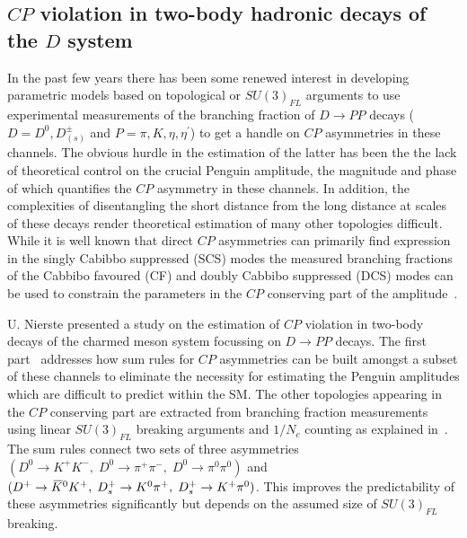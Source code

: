 \documentclass{PoS}
\def\Kbar{{\kern 0.2em\overline{\kern -0.2em \ensuremath{K}}{}}\xspace}
\newcommand\Kzb{{\ensuremath{\Kbar{}^0}}\xspace}
\newcommand{\CP}{{\ensuremath{C\!P}}\xspace}
\begin{document}
\subsection{\CP violation in two-body hadronic decays of the \boldmath $D$ system}
\label{sec:pheno:twobody}
In the past few years there has been some renewed interest in developing parametric models based on topological or $SU(3)_{FL}$ arguments to use experimental measurements of the branching fraction of $D\to P P $ decays ($D = D^0, D^\pm_{(s)}$ and $P=\pi,K,\eta,\eta^\prime$) to get a handle on \CP asymmetries in these channels. The obvious hurdle in the estimation of the latter has been the the lack of theoretical control on the crucial Penguin amplitude, the magnitude and phase of which quantifies the \CP asymmetry in these channels. In addition, the complexities of disentangling the short distance from the long distance at scales of these decays render theoretical estimation of many other topologies difficult. While it is well known that direct \CP asymmetries can primarily find expression in the singly Cabibbo suppressed (SCS) modes the measured branching fractions of the Cabbibo favoured (CF) and doubly Cabbibo suppressed (DCS) modes can be used to constrain the parameters in the \CP conserving part of the amplitude~\cite{Hiller:2012xm,Muller:2015rna,Nierste:2015zra}. 

U. Nierste presented a study on the estimation of \CP violation in two-body decays of the charmed meson system focussing on $D\to P P$ decays. The first part~\cite{Muller:2015rna} addresses how sum rules for \CP asymmetries can be built amongst a subset of these channels to eliminate the necessity for estimating the Penguin amplitudes which are difficult to predict within the SM. The other topologies appearing in the \CP conserving part are extracted from branching fraction measurements using linear $SU(3)_{FL}$ breaking arguments and $1/N_c$ counting as explained in~\cite{Muller:2015lua}. The sum rules connect two sets of three asymmetries $(D^0\to K^+K^-,\; D^0\to \pi^+\pi^-,\;D^0\to\pi^0\pi^0)$ and $(D^+\to \Kzb K^+,\;D^+_s\to K^0\pi^+,\;D^+_s\to K^+\pi^0)$. This improves the predictability of these asymmetries significantly but depends on the assumed size of $SU(3)_{FL}$ breaking.
\end{document}
